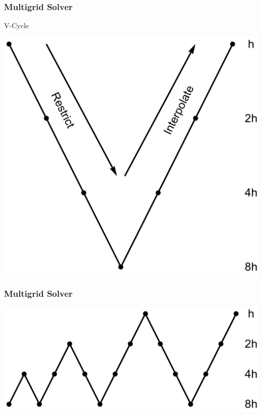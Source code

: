 \documentclass[10pt]{beamer}
\begin{document}
    \begin{frame}
      \frametitle{Multigrid Solver}
      V-Cycle
      \begin{center}
        \includegraphics[scale=0.25]{Figures/vcycle.pdf}
      \end{center}
    \end{frame}

    \begin{frame}
      \frametitle{Multigrid Solver}
      \begin{center}
        \includegraphics[scale=0.35]{Figures/mucycle.pdf}
      \end{center}
    \end{frame}
\end{document}
